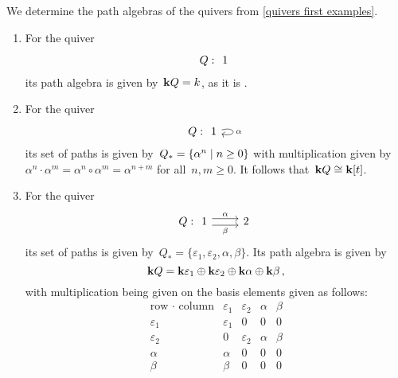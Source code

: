 \begin{example}
  We determine the path algebras of the quivers from \cref{quivers first examples}.
  \begin{enumerate}
    \item
      For the quiver
      \[
        Q :
        \begin{tikzcd}
          1
        \end{tikzcd}
      \]
      its path algebra is given by~$\mathbf{k} Q = k$, as it is .
    \item
      For the quiver
      \[
        Q :
        \begin{tikzcd}
            1
            \arrow[loop right]{r}[right]{\alpha}
        \end{tikzcd}
      \]
      its set of paths is given by~$Q_* = \{ \alpha^n \suchthat n \geq 0 \}$ with multiplication given by~$\alpha^n \cdot \alpha^m = \alpha^n \circ \alpha^m = \alpha^{n+m}$ for all~$n, m \geq 0$.
      It follows that~$\mathbf{k} Q \cong \mathbf{k}[t]$.
    \item
      For the quiver
      \[
        Q :
        \begin{tikzcd}
            1
            \arrow[shift left = 0.3em]{r}[above]{\alpha}
            \arrow[shift right = 0.3em]{r}[below]{\beta}
          & 2
        \end{tikzcd}
      \]
      its set of paths is given by~$Q_* = \{ \varepsilon_1, \varepsilon_2, \alpha, \beta \}$.
      Its path algebra is given by
      \[
          \mathbf{k} Q
        = \mathbf{k} \varepsilon_1 \oplus \mathbf{k} \varepsilon_2 \oplus \mathbf{k} \alpha \oplus \mathbf{k} \beta \,,
      \]
      with multiplication being given on the basis elements given as follows:
      \[
        \begin{array}{r|cccc}
            \text{row $\cdot$ column}
          & \varepsilon_1
          & \varepsilon_2
          & \alpha
          & \beta
          \\
          \hline
            \varepsilon_1
          & \varepsilon_1
          & 0
          & 0
          & 0
          \\
            \varepsilon_2
          & 0
          & \varepsilon_2
          & \alpha
          & \beta
          \\
            \alpha
          & \alpha
          & 0
          & 0
          & 0
          \\
            \beta
          & \beta
          & 0
          & 0
          & 0
        \end{array}
      \]

  \end{enumerate}
\end{example}



